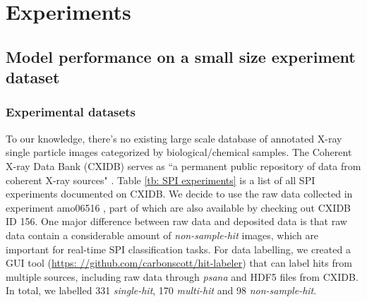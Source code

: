 \section{Experiments}

\subsection{Model performance on a small size experiment dataset}

\subsubsection{Experimental datasets}

To our knowledge, there's no existing large scale database of annotated X-ray
single particle images categorized by biological/chemical samples.  The Coherent
X-ray Data Bank (CXIDB) serves as ``a permanent public repository of data from
coherent X-ray sources" \cite{maiaCoherentXrayImaging2012}.  Table \ref{tb: SPI
experiments} is a list of all SPI experiments documented on CXIDB.  We decide to
use the raw data collected in experiment amo06516
\cite{liDiffractionDataAerosolized2020}, part of which are also available by
checking out CXIDB ID 156.  One major difference between raw data and deposited
data is that raw data contain a considerable amount of \textit{non-sample-hit}
images, which are important for real-time SPI classification tasks.  For data
labelling, we created a GUI tool (\url{https:
//github.com/carbonscott/hit-labeler}) that can label hits from multiple sources,
including raw data through \textit{psana} \cite{damianiLinacCoherentLight2016}
and HDF5 files from CXIDB.  In total, we labelled 331 \textit{single-hit}, 170
\textit{multi-hit} and 98 \textit{non-sample-hit}.  

